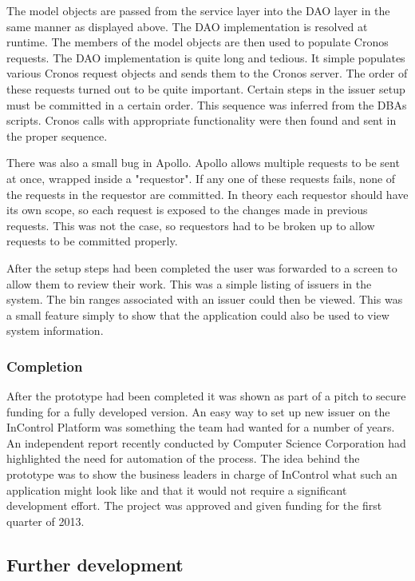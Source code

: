 \documentclass[a4paper, 11pt, titlepage]{article}
\begin{document}
The model objects are passed from the service layer into the DAO layer in the same manner as displayed above. The DAO implementation is resolved at runtime. The members of the model objects are then used to populate Cronos requests. The DAO implementation is quite long and tedious. It simple populates various Cronos request objects and sends them to the Cronos server. The order of these requests turned out to be quite important. Certain steps in the issuer setup must be committed in a certain order. This sequence was inferred from the DBAs scripts. Cronos calls with appropriate functionality were then found and sent in the proper sequence.  
 
There was also a small bug in Apollo. Apollo allows multiple requests to be sent at once, wrapped inside a "requestor". If any one of these requests fails, none of the requests in the requestor are committed. In theory each requestor should have its own scope, so each request is exposed to the changes made in previous requests. This was not the case, so requestors had to be broken up to allow requests to be committed properly. 
 
After the setup steps had been completed the user was forwarded to a screen to allow them to review their work. This was a simple listing of issuers in the system. The bin ranges associated with an issuer could then be viewed. This was a small feature simply to show that the application could also be used to view system information. 
 
\subsubsection{Completion} 
 
After the prototype had been completed it was shown as part of a pitch to secure funding for a fully developed version. An easy way to set up new issuer on the InControl Platform was something the team had wanted for a number of years. An independent report recently conducted by Computer Science Corporation had highlighted the need for automation of the process. The idea behind the prototype was to show the business leaders in charge of InControl what such an application might look like and that it would not require a significant development effort. The project was approved and given funding for the first quarter of 2013.  
 
\subsection{Further development} 
 
\end{document}
